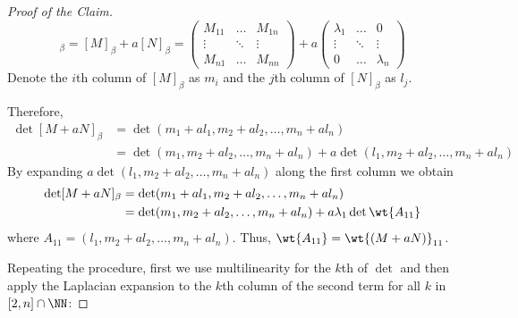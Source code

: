 \documentclass[11pt]{scrartcl}
\begin{document}
\begin{linenumbers}
\begin{proof}[Proof of the Claim]
    \begin{equation*}
      [M+aN]_{\beta} =  [M]_{\beta}+a[N]_{\beta}=
      \begin{pmatrix}
        M_{11}      & \dots  & M_{1n} \\
        \vdots      & \ddots & \vdots \\
        M_{n1}      & \dots  & M_{nn}
      \end{pmatrix}
      +
      a\begin{pmatrix}
        \lambda_{1} & \dots  & 0      \\
        \vdots      & \ddots & \vdots \\
        0           & \dots  & \lambda_{n}
      \end{pmatrix}
    \end{equation*}
    Denote the $i$th column of $[M]_{\beta}$ as $m_i$ and the $j$th column of $[N]_{\beta}$ as $l_{j}$.

    Therefore,
    \begin{align*}
      \det [M+aN]_{\beta} & = \det(m_1 + al_1, m_2 + al_2, \dots, m_n+al_{n}) \\
                          & = \det(m_1, m_2+al_2,\dots, m_n+al_n) + a\det(l_1, m_2+al_2,\dots, m_n+al_{n})
    \end{align*}
    By expanding $a\det(l_1, m_2+al_2,\dots, m_n+al_{n})$ along the first column we obtain
    \begin{align*}
      \det [M+aN]_{\beta} & = \det(m_1 + al_1, m_2 + al_2, \dots, m_n+al_{n}) \\
                          & = \det(m_1, m_2+al_2,\dots, m_n+al_n) + a\lambda_{1}\det\wt{A_{11}}
    \end{align*}
    where $A_{11} = (l_1,m_2+al_2,\dots, m_n+al_{n})$. Thus, $\wt{A_{11}} = \wt{(M+aN)}_{11}$.

    Repeating the procedure, first we use multilinearity for the $k$th
    of $\det$ and then apply the Laplacian expansion to the $k$th
    column of the second term for all $k$ in $[2, n]\cap \NN$:


\end{proof}
\end{linenumbers}
\end{document}
